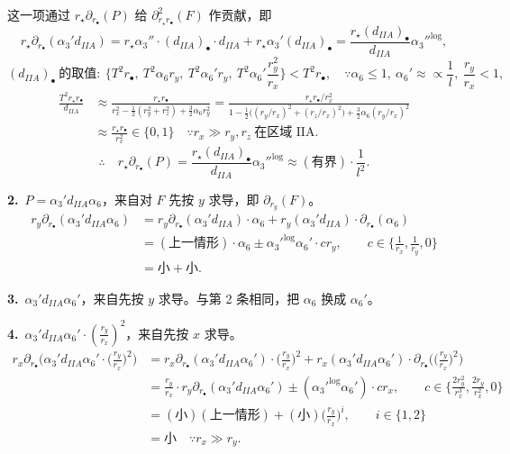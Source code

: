 这一项通过 $r_\star\partial_{r_\bullet}(P)$ 给 $\partial^2_{r_\star r_\bullet}(F)$ 作贡献，即
\[
r_\star\partial_{r_\bullet}(\alpha_3'd_{IIA})
=r_\star\alpha_3''\cdot(d_{IIA})_\bullet\cdot d_{IIA}+r_\star\alpha_3'(d_{IIA})_\bullet
=\frac{r_\star(d_{IIA})_\bullet}{d_{IIA}}{\alpha_3''}^{\log},
\]
\[
(d_{IIA})_\bullet\ \text{的取值}:\ \Big\{T^2r_\bullet,\ T^2\alpha_6r_y,\ T^2\alpha_6'r_y,\ T^2\alpha_6'\frac{r_y^2}{r_x}\Big\}<T^2r_\bullet,
\quad\because\alpha_6\le1,\ \alpha_6'\approx\propto\frac1l,\ \frac{r_y}{r_x}<1,
\]
\[
\begin{aligned}
\frac{T^2r_\star r_\bullet}{d_{IIA}}
&\approx\frac{r_\star r_\bullet}{r_x^2-\frac12(r_y^2+r_z^2)+\frac32\alpha_6r_y^2}
=\frac{r_\star r_\bullet/r_x^2}{1-\frac12\big((r_y/r_x)^2+(r_z/r_x)^2\big)+\frac32\alpha_6(r_y/r_x)^2}\\
&\approx\frac{r_\star r_\bullet}{r_x^2}\in\{0,1\}
\quad\because r_x\gg r_y,r_z\ \text{在区域 IIA}.
\end{aligned}
\]
\[
\therefore\quad r_\star\partial_{r_\bullet}(P)=\frac{r_\star(d_{IIA})_\bullet}{d_{IIA}}{\alpha_3''}^{\log}\approx(\text{有界})\cdot\frac1{l^2}.
\]

\medskip
\noindent\textbf{2.}\ $P=\alpha_3'd_{IIA}\alpha_6$，来自对 $F$ 先按 $y$ 求导，即 $\partial_{r_y}(F)$。
\begin{align*}
r_y\partial_{r_\bullet}(\alpha_3'd_{IIA}\alpha_6)
&=r_y\partial_{r_\bullet}(\alpha_3'd_{IIA})\cdot\alpha_6+r_y(\alpha_3'd_{IIA})\cdot\partial_{r_\bullet}(\alpha_6)\\
&=(\text{上一情形})\cdot\alpha_6\pm{\alpha_3'}^{\log}\alpha_6'\cdot cr_y,\qquad c\in\Big\{\frac1{r_x},\frac1{r_y},0\Big\}\\
&=\text{小}+\text{小}.
\end{align*}

\medskip
\noindent\textbf{3.}\ $\alpha_3'd_{IIA}\alpha_6'$，来自先按 $y$ 求导。与第 2 条相同，把 $\alpha_6$ 换成 $\alpha_6'$。

\medskip
\noindent\textbf{4.}\ $\alpha_3'd_{IIA}\alpha_6'\cdot\left(\frac{r_y}{r_x}\right)^2$，来自先按 $x$ 求导。
\begin{align*}
r_x\partial_{r_\bullet}\Big(\alpha_3'd_{IIA}\alpha_6'\cdot\Big(\frac{r_y}{r_x}\Big)^2\Big)
&=r_x\partial_{r_\bullet}(\alpha_3'd_{IIA}\alpha_6')\cdot\Big(\frac{r_y}{r_x}\Big)^2
+r_x(\alpha_3'd_{IIA}\alpha_6')\cdot\partial_{r_\bullet}\Big(\Big(\frac{r_y}{r_x}\Big)^2\Big)\\
&=\frac{r_y}{r_x}\cdot r_y\partial_{r_\bullet}(\alpha_3'd_{IIA}\alpha_6')
\pm({\alpha_3'}^{\log}\alpha_6')\cdot cr_x,\qquad c\in\Big\{\frac{2r_y^2}{r_x^3},\frac{2r_y}{r_x^2},0\Big\}\\
&=(\text{小})(\text{上一情形})+(\text{小})\Big(\frac{r_y}{r_x}\Big)^i,\qquad i\in\{1,2\}\\
&=\text{小}\quad\because r_x\gg r_y.
\end{align*}

